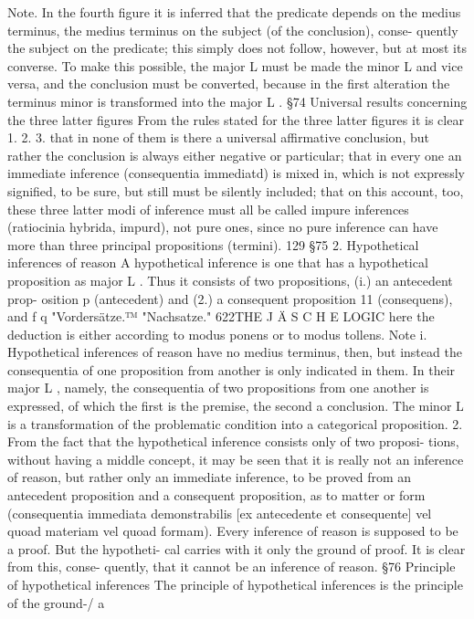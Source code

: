Note.
In the fourth figure it is inferred that the predicate depends on the medius
terminus, the medius terminus on the subject (of the conclusion), conse-
quently the subject on the predicate; this simply does not follow, however, but
at most its converse. To make this possible, the major L must be made the
minor L and vice versa, and the conclusion must be converted, because in the
first alteration the terminus minor is transformed into the major L .
§74
Universal results concerning the three latter figures
From the rules stated for the three latter figures it is clear
1.
2.
3.
that in none of them is there a universal affirmative conclusion, but rather the
conclusion is always either negative or particular;
that in every one an immediate inference (consequentia immediatd) is mixed in,
which is not expressly signified, to be sure, but still must be silently included;
that on this account, too,
these three latter modi of inference must all be called impure inferences
(ratiocinia hybrida, impurd), not pure ones, since no pure inference can have
more than three principal propositions (termini).
129
§75
2. Hypothetical inferences of reason
A hypothetical inference is one that has a hypothetical proposition as
major L . Thus it consists of two propositions, (i.) an antecedent prop-
osition p (antecedent) and (2.) a consequent proposition 11 (consequens), and
f
q
"Vordersätze.™
"Nachsatze."
622THE J Ä S C H E LOGIC
here the deduction is either according to modus ponens or to modus
tollens.
Note i. Hypothetical inferences of reason have no medius terminus, then, but
instead the consequentia of one proposition from another is only indicated
in them. In their major L , namely, the consequentia of two propositions from
one another is expressed, of which the first is the premise, the second a
conclusion. The minor L is a transformation of the problematic condition
into a categorical proposition.
2. From the fact that the hypothetical inference consists only of two proposi-
tions, without having a middle concept, it may be seen that it is really not
an inference of reason, but rather only an immediate inference, to be
proved from an antecedent proposition and a consequent proposition, as
to matter or form (consequentia immediata demonstrabilis [ex antecedente et
consequente] vel quoad materiam vel quoad formam).
Every inference of reason is supposed to be a proof. But the hypotheti-
cal carries with it only the ground of proof. It is clear from this, conse-
quently, that it cannot be an inference of reason.
§76
Principle of hypothetical inferences
The principle of hypothetical inferences is the principle of the ground-/ a
